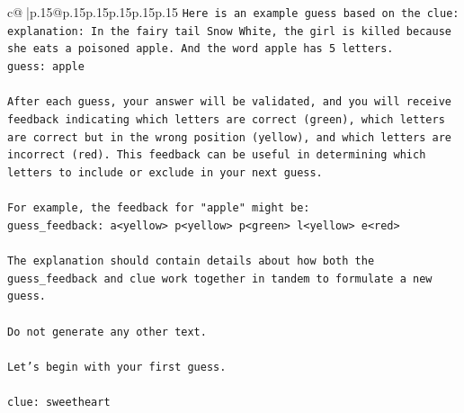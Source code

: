\documentclass{article}
\begin{document}
{\begin{supertabular}{c@{$\;$}|p{.15\linewidth}@{}p{.15\linewidth}p{.15\linewidth}p{.15\linewidth}p{.15\linewidth}p{.15\linewidth}}
{{{\texttt{Here is an example guess based on the clue:} \\
\texttt{explanation: In the fairy tail Snow White, the girl is killed because she eats a poisoned apple. And the word apple has 5 letters.} \\
\texttt{guess: apple} \\
\\ 
\texttt{After each guess, your answer will be validated, and you will receive feedback indicating which letters are correct (green), which letters are correct but in the wrong position (yellow), and which letters are incorrect (red). This feedback can be useful in determining which letters to include or exclude in your next guess.} \\
\\ 
\texttt{For example, the feedback for "apple" might be:} \\
\texttt{guess\_feedback: a<yellow> p<yellow> p<green> l<yellow> e<red>} \\
\\ 
\texttt{The explanation should contain details about how both the guess\_feedback and clue work together in tandem to formulate a new guess.} \\
\\ 
\texttt{Do not generate any other text.} \\
\\ 
\texttt{Let's begin with your first guess.} \\
\\ 
\texttt{clue: sweetheart} \\
            }
        }
    }
     \\ \\


\end{supertabular}}
\end{document}
